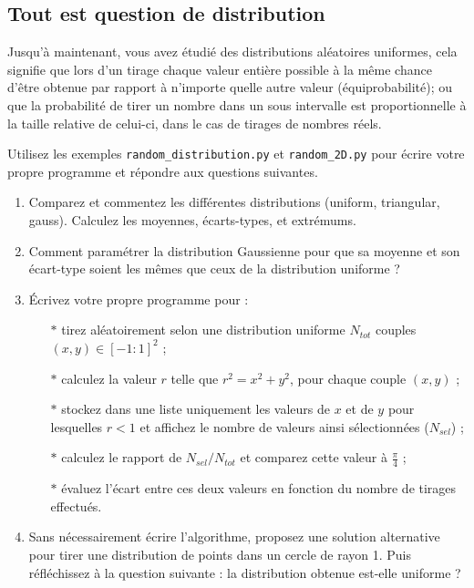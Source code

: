 

\subsection{Tout est question de distribution}

Jusqu'à  maintenant, vous  avez étudié   des distributions  aléatoires
uniformes, cela signifie que lors d'un tirage chaque valeur entière possible à la même
chance d'être obtenue par rapport à n'importe quelle autre valeur (équiprobabilité);
ou que la probabilité de tirer un nombre dans un sous intervalle est proportionnelle à la taille relative
de celui-ci, dans le cas de tirages de nombres réels.

Utilisez les  exemples \texttt{random\_distribution.py} et
\texttt{random\_2D.py} pour écrire votre  propre programme et répondre
aux questions suivantes.


\begin{enumerate}
\item Comparez  et commentez  les différentes  distributions (uniform,
  triangular, gauss).  Calculez les  moyennes, écarts-types, et extrémums.
\item Comment paramétrer la distribution Gaussienne pour que sa moyenne
  et son écart-type soient les mêmes que ceux de la distribution uniforme ?
\item Écrivez votre propre programme pour :
  \begin{itemize}
  \item[$\ast$] tirez  aléatoirement selon une distribution uniforme
    $N_{tot}$ couples $(x,y) \in [-1:1]^2$ ;
  \item[$\ast$] calculez la valeur $r$ telle que
    $r^2 = x^2+y^2$, pour chaque couple $(x,y)$ ;
  \item[$\ast$] stockez dans une liste
    uniquement les valeurs de $x$  et de $y$
    pour lesquelles $r < 1$ et  affichez le nombre de valeurs ainsi
    sélectionnées ($N_{sel}$) ;
  \item[$\ast$] calculez  le rapport de $N_{sel}/N_{tot}$  et comparez
    cette valeur à $\frac{\pi}{4}$ ;
  \item[$\ast$] évaluez l'écart entre ces  deux valeurs en fonction du
    nombre de tirages effectués.
  \end{itemize}
\item Sans  nécessairement écrire l'algorithme, proposez  une solution
  alternative pour tirer une distribution  de points dans un cercle de
  rayon 1. Puis réfléchissez à la question suivante :
  \og{} la distribution obtenue est-elle uniforme ? \fg{}





\end{enumerate}


\vfill
